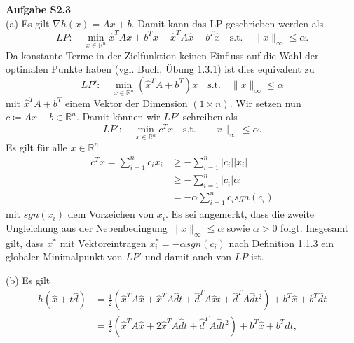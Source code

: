 \documentclass[ngerman, a4paper,12pt]{article}
\begin{document}

\par

\textbf{Aufgabe S2.3} \\

(a) Es gilt $\nabla h(x) = Ax + b$. Damit kann das LP geschrieben werden als
\begin{equation*}
	LP: \quad \min_{x \in \mathbb{R}^n} \hat{x}^T Ax + b^Tx - \hat{x}^TA \hat{x} - b^T \hat{x} \quad \text{s.t.} \quad \| x \|_{\infty} \leq \alpha.
\end{equation*}
Da konstante Terme in der Zielfunktion keinen Einfluss auf die Wahl der optimalen Punkte haben (vgl. Buch, Übung 1.3.1) ist dies equivalent zu
\begin{equation*}
	LP': \quad \min_{x \in \mathbb{R}^n} \left( \hat{x}^T A + b^T \right) x\quad \text{s.t.} \quad \| x \|_{\infty} \leq \alpha
\end{equation*}
mit $\hat{x}^T A + b^T$ einem Vektor der Dimension $(1\times n)$. Wir setzen nun $c \coloneqq A \hat{x} + b \in \mathbb{R}^n$. Damit können wir $LP'$ schreiben als
\begin{equation*}
LP': \quad \min_{x \in \mathbb{R}^n} c^T x\quad \text{s.t.} \quad \| x \|_{\infty} \leq \alpha.
\end{equation*}
Es gilt für alle $x \in \mathbb{R}^n$
\begin{equation*}
	\begin{split}
		c^Tx = \sum_{i=1}^{n} c_ix_i &\geq - \sum_{i=1}^{n} |c_i| |x_i| \\
		&\geq -\sum_{i=1}^{n} |c_i| \alpha \\
		&= -\alpha \sum_{i=1}^{n} c_i sgn(c_i) 
	\end{split}
\end{equation*}
mit $sgn(x_i)$ dem Vorzeichen von $x_i$. Es sei angemerkt, dass die zweite Ungleichung aus der Nebenbedingung $\| x \|_{\infty} \leq \alpha$ sowie $\alpha > 0$ folgt. Insgesamt gilt, dass $x^*$ mit Vektoreinträgen $x^*_i = - \alpha sgn(c_i)$ nach Definition 1.1.3 ein globaler Minimalpunkt von $LP'$ und damit auch von $LP$ ist.
\par
(b) Es gilt 
\begin{equation*}
	\begin{split}
		h(\hat{x} + t\hat{d}) &= \frac{1}{2} \left( \hat{x}^TA\hat{x} +\hat{x}^TA\hat{d}t + \hat{d}^TA\hat{x}t + \hat{d}^TA\hat{d}t^2 \right) + b^T\hat{x} + b^T\hat{d}t\\
		&= \frac{1}{2} \left( \hat{x}^TA\hat{x} +2 \hat{x}^TA\hat{d}t + \hat{d}^TA\hat{d}t^2 \right) + b^T\hat{x} + b^T\hat{d}t,
	\end{split}
\end{equation*}
\end{document}
